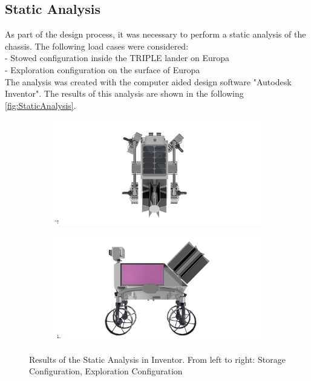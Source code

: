 \subsection{Static Analysis}

As part of the design process, it was necessary to perform a static analysis of the chassis. The following load cases were considered: \\
- Stowed configuration inside the TRIPLE lander on Europa \\
- Exploration configuration on the surface of Europa \\
The analysis was created with the computer aided design software "Autodesk Inventor". 
The results of this analysis are shown in the following \autoref{fig:StaticAnalysis}.

\begin{figure}[htb]
     \centering
     \begin{subfigure}[b]{0.49\textwidth}
         \centering
         \includegraphics[width=\textwidth]{Media/INSPIRE_Locomotion}
         \label{fig:StoreConfig}
     \end{subfigure}
     \hfill
     \begin{subfigure}[b]{0.49\textwidth}
         \centering
         \includegraphics[width=\textwidth]{Media/INSPIRE_Radiation}
         \label{fig:ExplConfig}
     \end{subfigure}
     \hfill
     \caption{Results of the Static Analysis in Inventor. From left to right: Storage Configuration, Exploration Configuration }
     \label{fig:StaticAnalysis}
\end{figure}

